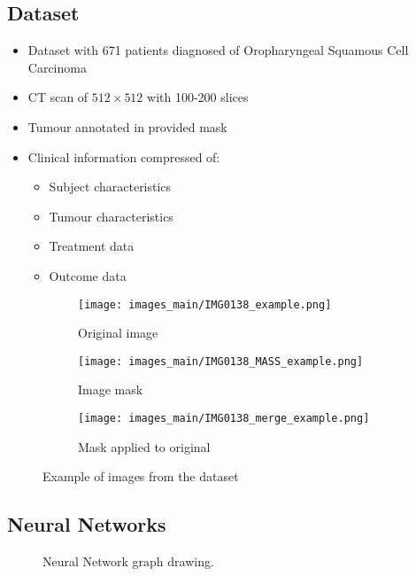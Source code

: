 \subsection{Dataset}
\begin{frame}{\insertsubsec}
  \begin{itemize}
    \item Dataset with 671 patients diagnosed of Oropharyngeal Squamous Cell Carcinoma
    \item CT scan of \( 512 \times 512 \) with 100-200 slices
    \item Tumour annotated in provided mask
    \item Clinical information compressed of:
    \begin{itemize}
      \item Subject characteristics
      \item Tumour characteristics
      \item Treatment data
      \item Outcome data
    \end{itemize}
  \end{itemize}
\end{frame}

\begin{frame}
  \begin{figure}
    \centering
    \begin{subfigure}[t]{.32\textwidth}
      \centering
      \texttt{[image: images\_main/IMG0138\_example.png]}
      \caption{Original image}
    \end{subfigure}
    \hfill
    \begin{subfigure}[t]{.32\textwidth}
      \centering
      \texttt{[image: images\_main/IMG0138\_MASS\_example.png]}
      \caption{Image mask}
    \end{subfigure}
    \hfill
    \begin{subfigure}[t]{.32\textwidth}
      \centering
      \texttt{[image: images\_main/IMG0138\_merge\_example.png]}
      \caption{Mask applied to original}
    \end{subfigure}
  
    \caption[Images from the dataset]{
      Example of images from the dataset
    }
  \end{figure}
\end{frame}

\subsection{Neural Networks}
\begin{frame}{\insertsubsec}
  \begin{figure}
    \centering
    
    \caption[Neural network graph]{
      Neural Network graph drawing. 
    }
  \end{figure}
\end{frame}

